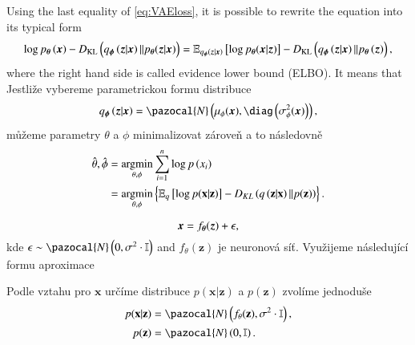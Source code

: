 Using the last equality of \eqref{eq:VAEloss}, it is possible to rewrite the equation into its typical form
\begin{equation}
\log p_{\boldsymbol{\theta}}\left(\boldsymbol{x}\right) - D_{\mathrm{KL}}\left(q_{\boldsymbol{\phi}}\left(\boldsymbol{z}\vert \boldsymbol{x} \right) \Vert p_{\boldsymbol{\theta}}(\boldsymbol{z}\vert \boldsymbol{x})\right) = \mathbb{E}_{q_{\boldsymbol{\phi}}\left(\boldsymbol{z}\vert \boldsymbol{x} \right)}\left[\log p_{\boldsymbol{\theta}}(\boldsymbol{x}\vert \boldsymbol{z}) \right] - D_{\mathrm{KL}}\left(q_{\boldsymbol{\phi}}\left(\boldsymbol{z}\vert\boldsymbol{x} \right) \Vert p_{\boldsymbol{\theta}}\left(\boldsymbol{z}\right)\right),
\end{equation}
where the right hand side is called evidence lower bound (ELBO). It means that 
Jestliže vybereme parametrickou formu distribuce
\begin{equation}
q_{\bphi}\left(\boldsymbol{z}\vert \bx \right) = \pazocal{N}\left(\mu_{\phi}(\bx), \diag\left(\sigma^2_{\phi}(\bx)\right) \right) ,
\end{equation}
můžeme parametry $\theta$ a $\phi$ minimalizovat zároveň a to následovně
\begin{equation}
\begin{split}
\hat{\theta},\hat{\phi} & = \mathop{\mathrm{argmin}}_{\theta, \phi}\sum_{i=1}^n\log p\left(x_i\right) \\
& = \mathop{\mathrm{argmin}}_{\theta, \phi}\left\lbrace  \mathbb{E}_q\left[\log p(\textbf{x}\vert \textbf{z}) \right] - D_{KL}\left(q\left(\textbf{z}\vert \textbf{x} \right) \Vert p(\textbf{z})\right)\right\rbrace . 
\end{split}
\end{equation}

\begin{equation}
\boldsymbol{x} = f_{\boldsymbol{\theta}}(\boldsymbol{z}) + \epsilon ,
\end{equation}
kde $\epsilon \sim \pazocal{N}\left(0,\sigma^2\cdot\mathbb{I}   \right)$ and  $f_{\theta}(\textbf{z})$ je neuronová síť.  Využijeme následující formu aproximace

Podle vztahu pro $\textbf{x}$ určíme distribuce $p\left(\textbf{x}\vert \textbf{z}\right)$ a $p\left(\textbf{z}\right)$ zvolíme jednoduše
\begin{equation}\label{VAE_latent}
\begin{split}
 p(\textbf{x}\vert \textbf{z}) &= \pazocal{N}\left(f_{\theta}(\textbf{z}),\sigma^2\cdot\mathbb{I} \right), \\
p(\textbf{z}) &= \pazocal{N}\left(0,\mathbb{I} \right).
\end{split}
\end{equation}

